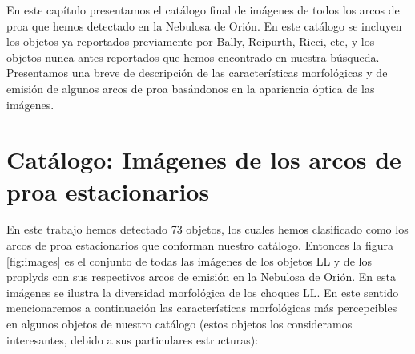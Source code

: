 %



%


\label{chap:results}

En este capítulo presentamos el catálogo final de imágenes  de todos los arcos de proa que hemos detectado en la Nebulosa de Orión. En este catálogo se incluyen los objetos ya reportados previamente por Bally, Reipurth, Ricci, etc, y los objetos nunca antes reportados que hemos encontrado en nuestra búsqueda. Presentamos una breve de descripción de las características morfológicas y de emisión de algunos arcos de proa basándonos en la apariencia óptica de las imágenes.   

\section{Catálogo: Imágenes de los arcos de proa estacionarios}
\label{sec:images}

En este trabajo hemos detectado 73 objetos, los cuales hemos clasificado como los arcos de proa estacionarios que conforman nuestro catálogo. Entonces la  figura \ref{fig:images} es el conjunto de todas las imágenes de los objetos LL y de los proplyds con sus respectivos arcos de emisión en la Nebulosa de Orión. En esta imágenes se ilustra la diversidad morfológica de los choques LL. En este sentido mencionaremos a continuación  las características morfológicas más percepcibles en algunos objetos de nuestro catálogo (estos objetos los consideramos interesantes, debido a sus particulares estructuras):\\

